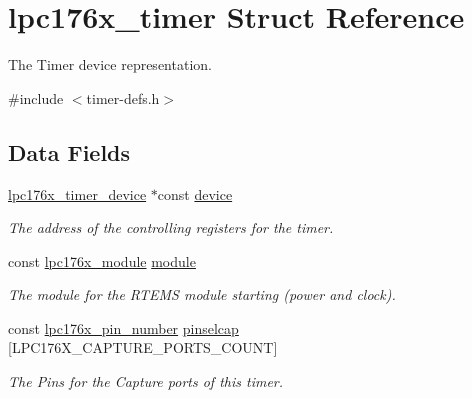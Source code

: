 \hypertarget{structlpc176x__timer}{}\section{lpc176x\+\_\+timer Struct Reference}
\label{structlpc176x__timer}


The Timer device representation.  




{\ttfamily \#include $<$timer-\/defs.\+h$>$}

\subsection*{Data Fields}
\begin{DoxyCompactItemize}
\item 
\mbox{\label{structlpc176x__timer_a15aaabb6695a7a15a30564c407acdcaf}} 
\mbox{\hyperlink{structlpc176x__timer__device}{lpc176x\+\_\+timer\+\_\+device}} $\ast$const \mbox{\hyperlink{structlpc176x__timer_a15aaabb6695a7a15a30564c407acdcaf}{device}}
\begin{DoxyCompactList}\small\item\em The address of the controlling registers for the timer. \end{DoxyCompactList}\item 
\mbox{\label{structlpc176x__timer_af9c6828b4fce225910b55a64fbec5725}} 
const \mbox{\hyperlink{common-types_8h_a7183a9a227854e33c20d9153adf747cb}{lpc176x\+\_\+module}} \mbox{\hyperlink{structlpc176x__timer_af9c6828b4fce225910b55a64fbec5725}{module}}
\begin{DoxyCompactList}\small\item\em The module for the R\+T\+E\+MS module starting (power and clock). \end{DoxyCompactList}\item 
\mbox{\label{structlpc176x__timer_acce5ab8abe8b3328876c023105b87a72}} 
const \mbox{\hyperlink{common-types_8h_a8215ced1557c43bc5925b691a3c1dc23}{lpc176x\+\_\+pin\+\_\+number}} \mbox{\hyperlink{structlpc176x__timer_acce5ab8abe8b3328876c023105b87a72}{pinselcap}} \mbox{[}L\+P\+C176\+X\+\_\+\+C\+A\+P\+T\+U\+R\+E\+\_\+\+P\+O\+R\+T\+S\+\_\+\+C\+O\+U\+NT\mbox{]}
\begin{DoxyCompactList}\small\item\em The Pins for the Capture ports of this timer. \end{DoxyCompactList}\item 

\end{DoxyCompactItemize}
